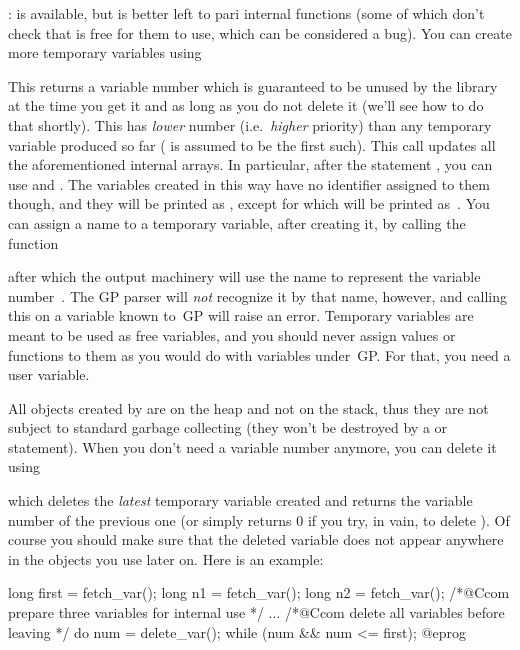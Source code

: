: 
 is available, but is better left to pari internal functions
(some of which don't check that  is free for them to use,
which can be considered a bug). You can create more temporary variables
using

\label{se:fetch_var}

\noindent
This returns a variable number which is guaranteed to be unused by the
library at the time you get it and as long as you do not delete it (we'll see
how to do that shortly). This has \emph{lower} number (i.e.~\emph{higher}
priority) than any temporary variable produced so far ( is
assumed to be the first such). This call updates all the aforementioned
internal arrays. In particular, after the statement ,
you can use  and . The variables created in this
way have no identifier assigned to them though, and they will be printed as
, except for  which will be printed
as~\kbd{\#}. You can assign a name to a temporary variable, after creating
it, by calling the function


\noindent after which the output machinery will use the name  to
represent the variable number~. The GP parser will \emph{not}
recognize it by that name, however, and calling this on a variable known
to~GP will raise an error. Temporary variables are meant to be used as free
variables, and you should never assign values or functions to them as you
would do with variables under~GP. For that, you need a user variable.

All objects created by  are on the heap and not on the stack,
thus they are not subject to standard garbage collecting (they won't be
destroyed by a  or  statement). When you don't
need a variable number anymore, you can delete it using


\noindent which deletes the \emph{latest} temporary variable created and
returns the variable number of the previous one (or simply returns 0 if you
try, in vain, to delete ). Of course you should make sure that
the deleted variable does not appear anywhere in the objects you use later
on. Here is an example:

\bprog
{
  long first = fetch_var();
  long n1 = fetch_var();
  long n2 = fetch_var(); /*@Ccom prepare three variables for internal use */
  ...
  /*@Ccom delete all variables before leaving */
  do { num = delete_var(); } while (num && num <= first);
}@eprog

